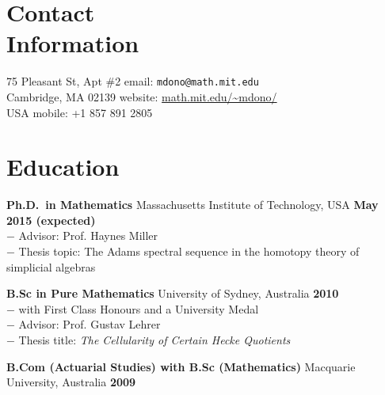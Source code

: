 \documentclass[margin,line]{resume}
\newcommand{\award}[3]{\textbf{#1} #2 \hfill \textbf{#3}
           
\vspace{-2.3mm}}
\newcommand{\twolineaward}[4]{\textbf{#1} #2 \hfill \textbf{#4}\\%
#3
           
\vspace{-2.3mm}}
\begin{document}
\begin{resume}

\vspace{4mm}
    \section{\mysidestyle Contact\\Information}

    75 Pleasant St, Apt \#2                 \hfill email: \texttt{mdono@math.mit.edu}                 
\vspace{0mm}\\\vspace{0mm}%
    Cambridge, MA  02139                    \hfill website: \url{math.mit.edu/~mdono/} \vspace{0mm}\\\hspace{-1mm} 				
    USA                				\hfill mobile: +1 857 891 2805\ \textup{}





    \section{\mysidestyle Education}

\twolineaward{Ph.D.\ in Mathematics}{Massachusetts Institute of Technology, USA}{%
\phantom{space}$-$ Advisor: Prof. Haynes Miller\\
\phantom{space}$-$ Thesis topic: The Adams spectral sequence in the homotopy theory of simplicial algebras%
}{May 2015 (expected)}
\twolineaward{B.Sc in Pure Mathematics}{University of Sydney, Australia}{%
\phantom{space}$-$ with First Class Honours and a University Medal\\
\phantom{space}$-$ Advisor: Prof. Gustav Lehrer\\
\phantom{space}$-$ Thesis title: \emph{The Cellularity of Certain Hecke Quotients}
}{2010}
\award{B.Com (Actuarial Studies) with B.Sc (Mathematics)}{Macquarie University, Australia}{2009}


\end{resume}
\end{document}
